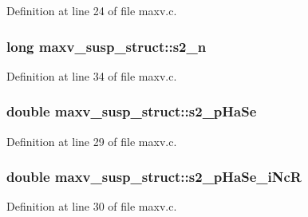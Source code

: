 Definition at line 24 of file maxv.\+c.

\subsubsection[{\texorpdfstring{s2\+\_\+n}{s2_n}}]{\setlength{\rightskip}{0pt plus 5cm}long maxv\+\_\+susp\+\_\+struct\+::s2\+\_\+n}\hypertarget{structmaxv__susp__struct_a40bb422bb5b7dea013834018d41d36bd}{}\label{structmaxv__susp__struct_a40bb422bb5b7dea013834018d41d36bd}


Definition at line 34 of file maxv.\+c.

\subsubsection[{\texorpdfstring{s2\+\_\+p\+Ha\+Se}{s2_pHaSe}}]{\setlength{\rightskip}{0pt plus 5cm}double maxv\+\_\+susp\+\_\+struct\+::s2\+\_\+p\+Ha\+Se}\hypertarget{structmaxv__susp__struct_ab34e85bda7fcc2e3c8458c9b8d92150b}{}\label{structmaxv__susp__struct_ab34e85bda7fcc2e3c8458c9b8d92150b}


Definition at line 29 of file maxv.\+c.

\subsubsection[{\texorpdfstring{s2\+\_\+p\+Ha\+Se\+\_\+i\+NcR}{s2_pHaSe_iNcR}}]{\setlength{\rightskip}{0pt plus 5cm}double maxv\+\_\+susp\+\_\+struct\+::s2\+\_\+p\+Ha\+Se\+\_\+i\+NcR}\hypertarget{structmaxv__susp__struct_ab1eedf087b0ac05d2f450685cf50342a}{}\label{structmaxv__susp__struct_ab1eedf087b0ac05d2f450685cf50342a}


Definition at line 30 of file maxv.\+c.

